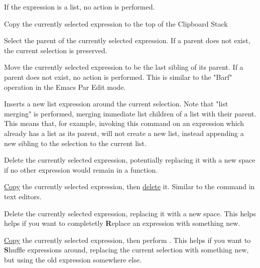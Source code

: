 If the expression is a list, no action is performed.


Copy the currently selected expression to the top of the Clipboard Stack

Select the parent of the currently selected expression. If a parent does not
exist, the current selection is preserved.

Move the currently selected expression to be the last sibling of its parent.
If a parent does not exist, no action is performed.
This is similar to the "Barf" operation in the Emacs Par Edit mode.


Inserts a new list expression around the current selection. Note that "list
merging" is performed, merging immediate list children of a list with their
parent. This means that, for example, invoking this command on an expression
which already has a list as its parent, will not create a new list, instead
appending a new sibling to the selection to the current list.

Delete the currently selected expression, potentially replacing it with a new
space if no other expression would remain in a function.


\hyperref[cmd:copy]{Copy} the currently selected expression, then
\hyperref[cmd:delete]{delete} it. Similar to the  command in
text editors.


Delete the currently selected expression, replacing it with a new space. This
helps helps if you want to completetly \textbf{R}eplace an expression with
something new.

\hyperref[cmd:copy]{Copy} the currently selected expression, then perform
\hyperref[cmd:delete_blank]{}. This helps if you want
to \textbf{S}huffle expressions around, replacing the current selection with
something new, but using the old expression somewhere else.

